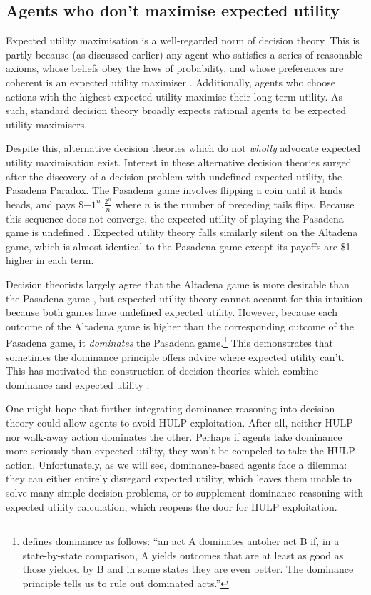 \documentclass{article}
\begin{document}
\subsection{Agents who don't maximise expected utility}

Expected utility maximisation is a well-regarded norm of decision theory. This is partly because (as discussed earlier) any agent who satisfies a series of reasonable axioms, whose beliefs obey the laws of probability, and whose preferences are coherent is an expected utility maximiser \citep{von1944games}. Additionally, agents who choose actions with the highest expected utility maximise their long-term utility. As such, standard decision theory broadly expects rational agents to be expected utility maximisers.

Despite this, alternative decision theories which do not \textit{wholly} advocate expected utility maximisation exist. Interest in these alternative decision theories surged after the discovery of a decision problem with undefined expected utility, the Pasadena Paradox. The Pasadena game involves flipping a coin until it lands heads, and pays \$\(-1^n.\frac{2^n}{n}\) where \(n\) is the number of preceding tails flips. Because this sequence does not converge, the expected utility of playing the Pasadena game is undefined \citep{nover2004vexing}. Expected utility theory falls similarly silent on the Altadena game, which is almost identical to the Pasadena game except its payoffs are \$1 higher in each term.

Decision theorists largely agree that the Altadena game is more desirable than the Pasadena game \citep[pg. 241]{nover2004vexing}, but expected utility theory cannot account for this intuition because both games have undefined expected utility. However, because each outcome of the Altadena game is higher than the corresponding outcome of the Pasadena game, it \textit{dominates} the Pasadena game.\footnote{\citet[pg. 9]{resnik1987choices} defines dominance as follows: ``an act A dominates antoher act B if, in a state-by-state comparison, A yields outcomes that are at least as good as those yielded by B and in some states they are even better. The dominance principle tells us to rule out dominated acts.''} This demonstrates that sometimes the dominance principle offers advice where expected utility can't. This has motivated the construction of decision theories which combine dominance and expected utility \citep{easwaran2009dominance, colyvan2008relative, colyvan2006no}.

One might hope that further integrating dominance reasoning into decision theory could allow agents to avoid HULP exploitation. After all, neither HULP nor walk-away action dominates the other. Perhaps if agents take dominance more seriously than expected utility, they won't be compeled to take the HULP action. Unfortunately, as we will see, dominance-based agents face a dilemma: they can either entirely disregard expected utility, which leaves them unable to solve many simple decision problems, or to supplement dominance reasoning with expected utility calculation, which reopens the door for HULP exploitation.
\end{document}
